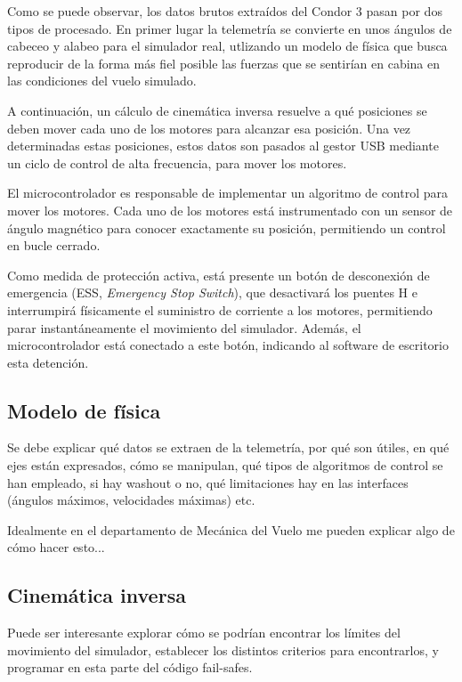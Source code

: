 \documentclass[10pt, oneside]{trabajo}
\begin{document}
Como se puede observar, los datos brutos extraídos del Condor 3 pasan por dos tipos de procesado. En primer lugar la telemetría se convierte en unos ángulos de cabeceo y alabeo para el simulador real, utlizando un modelo de física que busca reproducir de la forma más fiel posible las fuerzas que se sentirían en cabina en las condiciones del vuelo simulado.
\par A continuación, un cálculo de cinemática inversa resuelve a qué posiciones se deben mover cada uno de los motores para alcanzar esa posición. Una vez determinadas estas posiciones, estos datos son pasados al gestor USB mediante un ciclo de control de alta frecuencia, para mover los motores.
\par El microcontrolador es responsable de implementar un algoritmo de control  para mover los motores. Cada uno de los motores está instrumentado con un sensor de ángulo magnético para conocer exactamente su posición, permitiendo un control en bucle cerrado.
\par Como medida de protección activa, está presente un botón de desconexión de emergencia (ESS, \textit{Emergency Stop Switch}), que desactivará los puentes H e interrumpirá físicamente el suministro de corriente a los motores, permitiendo parar instantáneamente el movimiento del simulador. Además, el microcontrolador está conectado a este botón, indicando al software de escritorio esta detención.

\subsection{Modelo de física}
\par Se debe explicar qué datos se extraen de la telemetría, por qué son útiles, en qué ejes están expresados, cómo se manipulan, qué tipos de algoritmos de control se han empleado, si hay washout o no, qué limitaciones hay en las interfaces (ángulos máximos, velocidades máximas) etc.
\par Idealmente en el departamento de Mecánica del Vuelo me pueden explicar algo de cómo hacer esto...

\subsection{Cinemática inversa}
\par Puede ser interesante explorar cómo se podrían encontrar los límites del movimiento del simulador, establecer los distintos criterios para encontrarlos, y programar en esta parte del código fail-safes.
\end{document}
